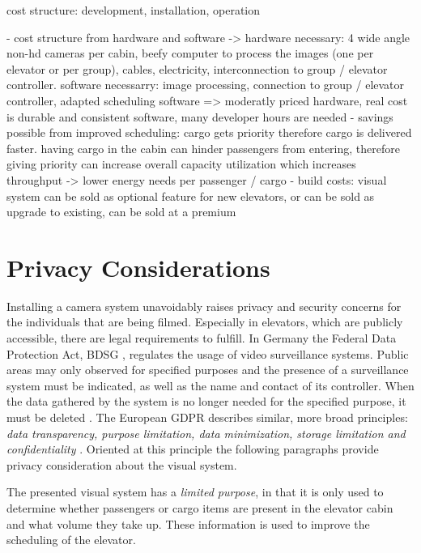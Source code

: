 cost structure: development, installation, operation

- cost structure from hardware and software -> hardware necessary: 4 wide angle non-hd cameras per cabin, beefy computer to process the images (one per elevator or per group), cables, electricity, interconnection to group / elevator controller. software necessarry: image processing, connection to group / elevator controller, adapted scheduling software => moderatly priced hardware, real cost is durable and consistent software, many developer hours are needed
- savings possible from improved scheduling: cargo gets priority therefore cargo is delivered faster. having cargo in the cabin can hinder passengers from entering, therefore giving priority can increase overall capacity utilization which increases throughput -> lower energy needs per passenger / cargo
- build costs: visual system can be sold as optional feature for new elevators, or can be sold as upgrade to existing, can be sold at a premium



\section{Privacy Considerations}
Installing a camera system unavoidably raises privacy and security concerns 
for the individuals that are being filmed.
Especially in elevators, which are publicly accessible, there are legal requirements to fulfill.
In Germany the Federal Data Protection Act, \ac{BDSG} \autocite[][]{bmjv2009bdsg}, 
regulates the usage of video surveillance systems.
Public areas may only observed for specified purposes and the presence of a surveillance system must be indicated,
as well as the name and contact of its controller. 
When the data gathered by the system is no longer needed for the specified purpose, it must be deleted 
\autocite[][§~4]{bmjv2009bdsg}.
The European \ac{GDPR} \autocite{eu2016gdpr} describes similar, more broad principles:  
\emph{data transparency, purpose limitation, data minimization, storage limitation and confidentiality}
\autocite{ico2018gdpr}.
Oriented at this principle the following paragraphs provide privacy consideration about the visual system.

The presented visual system has a \emph{limited purpose}, in that it is only used 
to determine whether passengers or cargo items are present in the elevator cabin 
and what volume they take up. 
These information is used to improve the scheduling of the elevator.

